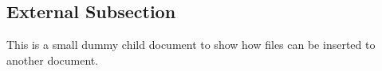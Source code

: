 
\subsection{\label{sub:External-Subsection}External Subsection}

This is a small dummy child document to show how files can be inserted
to another document.
